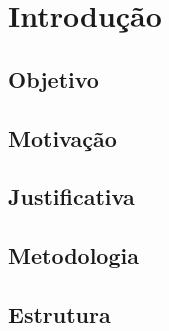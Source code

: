 \chapter{Introdução}

\section{Objetivo}
\section{Motivação}
\section{Justificativa}
\section{Metodologia}
\section{Estrutura}